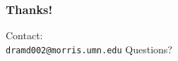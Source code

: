 \documentclass{beamer}
\begin{document}
\begin{frame}
\frametitle{Thanks!}
\begin{center}
Contact: \\ \texttt{dramd002@morris.umn.edu}
\linebreak
\linebreak
\linebreak
{\huge Questions?}
\end{center}
\end{frame}


%
\end{document}
